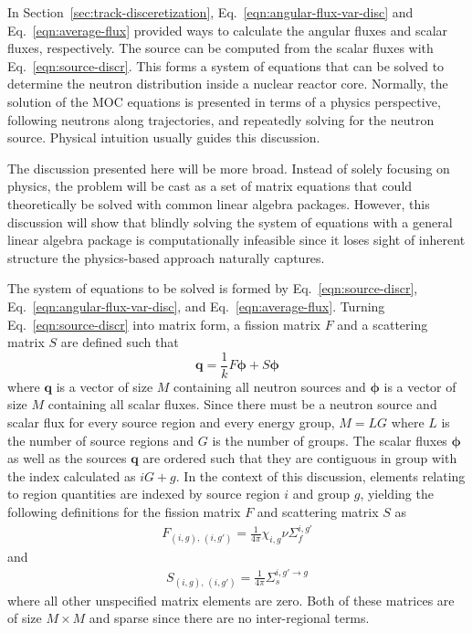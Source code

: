 In Section~\ref{sec:track-disceretization}, Eq.~\ref{eqn:angular-flux-var-disc} and Eq.~\ref{eqn:average-flux} provided ways to calculate the angular fluxes and scalar fluxes, respectively. The source can be computed from the scalar fluxes with Eq.~\ref{eqn:source-discr}. This forms a system of equations that can be solved to determine the neutron distribution inside a nuclear reactor core. Normally, the solution of the \ac{MOC} equations is presented in terms of a physics perspective, following neutrons along trajectories, and repeatedly solving for the neutron source. Physical intuition usually guides this discussion.

The discussion presented here will be more broad. Instead of solely focusing on physics, the problem will be cast as a set of matrix equations that could theoretically be solved with common linear algebra packages. However, this discussion will show that blindly solving the system of equations with a general linear algebra package is computationally infeasible since it loses sight of inherent structure the physics-based approach naturally captures.

The system of equations to be solved is formed by Eq.~\ref{eqn:source-discr}, Eq.~\ref{eqn:angular-flux-var-disc}, and Eq.~\ref{eqn:average-flux}. Turning Eq.~\ref{eqn:source-discr} into matrix form, a fission matrix $F$ and a scattering matrix $S$ are defined such that
\begin{equation}
\mathbf{q} = \frac{1}{k} F \boldsymbol{\phi} + S \boldsymbol{\phi}
\label{eqn:matrix-source-calc}
\end{equation}
where $\mathbf{q}$ is a vector of size $M$ containing all neutron sources and $\boldsymbol{\phi}$ is a vector of size $M$ containing all scalar fluxes. Since there must be a neutron source and scalar flux for every source region and every energy group, $M = L G$ where $L$ is the number of source regions and $G$ is the number of groups. The scalar fluxes $\boldsymbol{\phi}$ as well as the sources $\mathbf{q}$ are ordered such that they are contiguous in group with the index calculated as $i G + g$. In the context of this discussion, elements relating to region quantities are indexed by source region $i$ and group $g$, yielding the following definitions for the fission matrix $F$ and scattering matrix $S$ as
\begin{eqnarray}
F_{\left(i, g\right), \, \left(i, g'\right)} = \frac{1}{4\pi} \chi_{i,g} \nu \Sigma_f^{i,g'}
\label{eqn:fission-matrix}
\end{eqnarray}
and
\begin{eqnarray}
S_{\left(i, g\right), \, \left(i, g'\right)} = \frac{1}{4\pi} \Sigma_s^{i,g' \rightarrow g}
\label{eqn:scattering-matrix}
\end{eqnarray}
where all other unspecified matrix elements are zero. Both of these matrices are of size $M \times M$ and sparse since there are no inter-regional terms.

